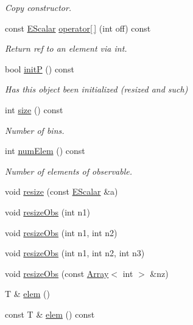 \begin{DoxyCompactItemize}
\begin{DoxyCompactList}\small\item\em Copy constructor. \end{DoxyCompactList}\item 
const \mbox{\hyperlink{classENSEM_1_1EScalar}{E\+Scalar}} \mbox{\hyperlink{classENSEM_1_1EScalar_a20c80375941641aca36355253b3479ac}{operator\mbox{[}$\,$\mbox{]}}} (int off) const
\begin{DoxyCompactList}\small\item\em Return ref to an element via int. \end{DoxyCompactList}\item 
bool \mbox{\hyperlink{classENSEM_1_1EScalar_ac5b2f0fbee6aa61f80bcd2d0b4d5188c}{initP}} () const
\begin{DoxyCompactList}\small\item\em Has this object been initialized (resized and such) \end{DoxyCompactList}\item 
int \mbox{\hyperlink{classENSEM_1_1EScalar_a314f162d71b15a8eb7e3382a274aa12b}{size}} () const
\begin{DoxyCompactList}\small\item\em Number of bins. \end{DoxyCompactList}\item 
int \mbox{\hyperlink{classENSEM_1_1EScalar_a63584568dc8b1817a57656cc072205b2}{num\+Elem}} () const
\begin{DoxyCompactList}\small\item\em Number of elements of observable. \end{DoxyCompactList}\item 
void \mbox{\hyperlink{classENSEM_1_1EScalar_aff8eff3acd3686a6ae0b1a1a0dfd6426}{resize}} (const \mbox{\hyperlink{classENSEM_1_1EScalar}{E\+Scalar}} \&a)
\item 
void \mbox{\hyperlink{classENSEM_1_1EScalar_af9faf602be10ce072be3fc532a7e17fe}{resize\+Obs}} (int n1)
\item 
void \mbox{\hyperlink{classENSEM_1_1EScalar_ad4fe54c2fb8a3420e1e452228d8d40b1}{resize\+Obs}} (int n1, int n2)
\item 
void \mbox{\hyperlink{classENSEM_1_1EScalar_a1849b1cf66ab1a983ca9e1f268afd109}{resize\+Obs}} (int n1, int n2, int n3)
\item 
void \mbox{\hyperlink{classENSEM_1_1EScalar_a9273a529024099effecf6962eafa044e}{resize\+Obs}} (const \mbox{\hyperlink{classXMLArray_1_1Array}{Array}}$<$ int $>$ \&nz)
\item 
T \& \mbox{\hyperlink{classENSEM_1_1EScalar_a8de3b840367731efc862fc6943119152}{elem}} ()
\item 
const T \& \mbox{\hyperlink{classENSEM_1_1EScalar_ab3fb9173e700cc3e0bf94ffcb9d04c29}{elem}} () const
\end{DoxyCompactItemize}

